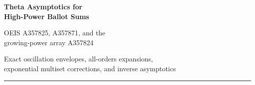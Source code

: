 \documentclass[11pt,a4paper]{article}
\numberwithin{equation}{section}
\theoremstyle{definition}
\newcommand{\ee}{\mathrm e}
\begin{document}
\hypersetup{pageanchor=false}
\begin{titlepage}
\thispagestyle{empty}
\vspace*{7mm}
\vspace{14mm}
\begin{flushleft}
{\Huge\bfseries Theta Asymptotics for\\[3pt] High-Power Ballot Sums\par}
\vspace{7mm}
{\Large OEIS A357825, A357871, and the\\growing-power array A357824\par}
\vspace{7mm}
{\large Exact oscillation envelopes, all-orders expansions,\\
exponential multiset corrections, and inverse asymptotics\par}
\end{flushleft}
\vspace{8mm}
\noindent\rule{\textwidth}{0.5pt}
\begin{abstract}
Let $B(n,h)$ count nonnegative unit-step paths of length $n$ ending at height
$h$, and let $a_n=\sum_h B(n,h)^n$. The OEIS records the leading root growth
of this sequence and the failure of a natural normalized ratio to converge.
We derive its missing multiplicative structure: the ratio is a Jacobi theta
function evaluated at a drifting parity-sensitive square-root phase, times
$\ee^{-5/6}$. A uniform all-orders expansion expresses every subsequent
coefficient as a Gaussian-weighted polynomial sum, equivalently a finite
linear combination of theta derivatives. We prove the exact lower and upper
limiting constants, identify the entire cluster interval and limiting phase
law, and obtain oscillatory adjacent-ratio and Tur\'an asymptotics. In
particular, the sequence is eventually strictly log-convex.


\end{abstract}
\end{titlepage}
\end{document}
